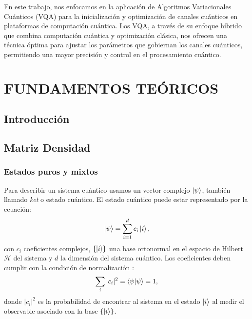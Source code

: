 \documentclass[letterpaper,12pt]{thesisECFM}
\theoremstyle{plain}
\theoremstyle{definition}
\theoremstyle{definition}
\theoremstyle{remark}
\newcommand{\1}{\mathbb{1}}
\begin{document}
En este trabajo, nos enfocamos en la aplicación de Algoritmos Variacionales Cuánticos (VQA) para la inicialización y optimización de canales cuánticos en plataformas de computación cuántica. Los VQA, a través de su enfoque híbrido que combina computación cuántica y optimización clásica, nos ofrecen una técnica óptima para ajustar los parámetros que gobiernan los canales cuánticos, permitiendo una mayor precisión y control en el procesamiento cuántico.

 
\chapter{FUNDAMENTOS TEÓRICOS} \label{cap:fundamentos:teoricos}%
\section{Introducción} %
\section{Matriz Densidad} %
\subsection{Estados puros y mixtos} %
Para describir un sistema cuántico usamos un vector complejo $\ket{\psi}$,
también llamado \textit{ket} o estado cuántico. El
estado cuántico puede estar representado por la ecuación: 
\begin{equation}
     \label{eq:1.1}
         \ket{\psi} = \sum_{i=1}^{d} c_i \ket{i},
\end{equation}
con $c_i$ coeficientes complejos,
$\{\ket{i}\}$ una base ortonormal en el espacio de Hilbert $\mathcal{H}$ del
sistema  y $d$ la dimensión del
sistema cuántico.  Los coeficientes deben cumplir con la condición de
normalización \cite{nielsen_chuang_2011}:
    \begin{equation}
    \label{ec::1.2}
           \sum_i |c_i|^2=\braket{\psi}{\psi}=1, 
    \end{equation} 
donde $|c_i|^2$ es la probabilidad de encontrar al sistema en el estado
$\ket{i}$ al medir el observable asociado con la base $\{\ket{i} \}$.
\end{document}
